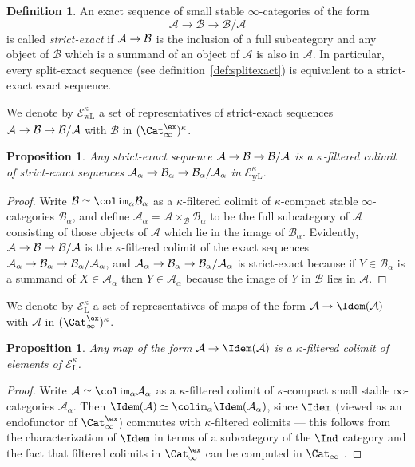 \documentclass{amsart}
\renewcommand{\to}{\mathchoice{\longrightarrow}{\rightarrow}{\rightarrow}{\rightarrow}}
\newcommand{\cA}{{\mathcal A}}
\newcommand{\cB}{{\mathcal B}}
\newcommand{\cE}{{\mathcal E}}
\let\catsymbfont\mathcal
\newcommand{\aA}{{\catsymbfont{A}}}
\newcommand{\aB}{{\catsymbfont{B}}}
\newcommand{\icat}{\Cat_\i}
\newcommand{\stabcat}{\Cat_\i^{\ex}}
\newcommand{\too}{\longrightarrow}%
\renewcommand{\i}{\infty}
\numberwithin{equation}{section}
\newtheorem{proposition}[equation]{Proposition}
\theoremstyle{definition}
\newtheorem{definition}[equation]{Definition}
\begin{document}
\begin{definition}\label{def:strictexact}
An exact sequence of small stable $\i$-categories of the form
\begin{equation}\label{eq:strict}
\cA \too \cB \too \cB/\cA
\end{equation}
is called {\em strict-exact} if $\aA\to\aB$ is the inclusion of a full subcategory and any object of $\cB$ which is a summand of an object of $\cA$ is also in $\cA$. In particular, every split-exact sequence (see definition~\ref{def:splitexact}) is equivalent to a strict-exact exact sequence.
\end{definition}
We denote by $\underline{\cE_\mathrm{wL}^\kappa}$ a set of representatives of
strict-exact sequences $\aA\to\cB\to\cB/\cA$ with $\cB$ in
$(\stabcat)^\kappa$. 
\begin{proposition}\label{prop:approx}
Any strict-exact sequence $\cA \to \cB \to \cB/\cA$ is a $\kappa$-filtered colimit of strict-exact sequences $\cA_{\alpha} \to \cB_{\alpha} \to \cB_{\alpha}/\cA_{\alpha}$ in $\underline{\cE_\mathrm{wL}^\kappa}$.
\end{proposition}
\begin{proof}
Write $\cB\simeq\colim_\alpha\cB_\alpha$ as a $\kappa$-filtered colimit of $\kappa$-compact stable $\i$-categories $\cB_\alpha$, and define $\aA_\alpha=\aA\times_\aB\aB_\alpha$ to be the full subcategory of $\aA$ consisting of those objects of $\aA$ which lie in the image of $\aB_\alpha$.
Evidently, $\aA\to\aB\to\aB/\aA$ is the $\kappa$-filtered colimit of the exact sequences $\aA_\alpha\to\aB_\alpha\to\aB_\alpha/\aA_\alpha$, and $\aA_\alpha\to\aB_\alpha\to\aB_\alpha/\aA_\alpha$ is strict-exact because if $Y\in\aB_\alpha$ is a summand of $X\in\aA_\alpha$ then $Y\in\aA_\alpha$ because the image of $Y$ in $\aB$ lies in $\aA$.
\end{proof}

We denote by $\cE^\kappa_\mathrm{L}$ a set of representatives of maps of the form $\cA \to \Idem(\cA)$ with $\cA$ in $(\stabcat)^\kappa$.
\begin{proposition}\label{prop:approx1}
Any map of the form $\cA \to \Idem(\cA)$ is a $\kappa$-filtered colimit of elements of $\cE^\kappa_\mathrm{L}$.
\end{proposition}
\begin{proof}
Write $\cA\simeq\colim_\alpha\aA_\alpha$ as a $\kappa$-filtered
colimit of $\kappa$-compact small stable $\i$-categories
$\cA_{\alpha}$.  Then
$\Idem(\cA)\simeq\colim_\alpha\Idem(\aA_\alpha)$, since $\Idem$ 
(viewed as an endofunctor of $\stabcat$) commutes with
$\kappa$-filtered colimits --- this follows from the characterization
of $\Idem$ in terms of a subcategory of the $\Ind$
category \cite[5.4.2.4]{HTT} and the fact that filtered colimits in
$\stabcat$ can be computed in $\icat$ \cite[1.1.4.6]{HAG}.
\end{proof}
\end{document}
